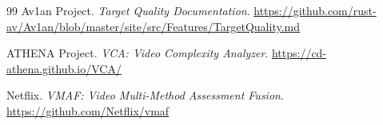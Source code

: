 \documentclass[UTF8,a4paper,11pt]{ctexart}
\begin{document}
\begin{thebibliography}{99}
Av1an Project.
\newblock \textit{Target Quality Documentation}.
\newblock \url{https://github.com/rust-av/Av1an/blob/master/site/src/Features/TargetQuality.md}

ATHENA Project.
\newblock \textit{VCA: Video Complexity Analyzer}.
\newblock \url{https://cd-athena.github.io/VCA/}

Netflix.
\newblock \textit{VMAF: Video Multi-Method Assessment Fusion}.
\newblock \url{https://github.com/Netflix/vmaf}

\end{thebibliography}
\end{document}
